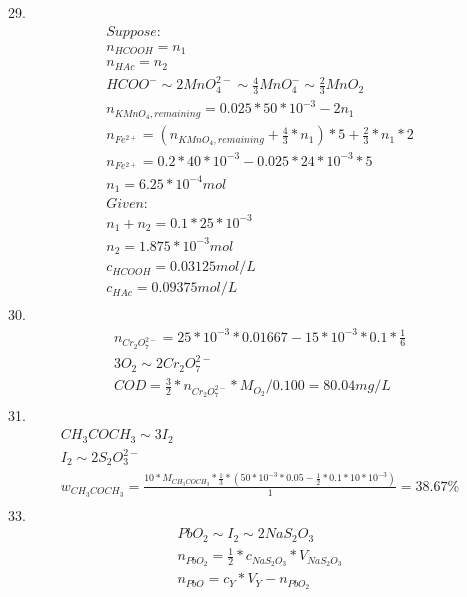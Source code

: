 \documentclass{article}
\begin{document}
29.\begin{equation}
    \begin{multlined}
        Suppose:\\
        n_{HCOOH} = n_1\\
        n_{HAc} = n_2\\
        HCOO^-\sim2MnO_4^{2-}\sim\frac{4}{3}MnO_4^-\sim \frac{2}{3}MnO_2\\
        n_{KMnO_4, remaining} = 0.025*50*10^{-3} - 2n_1\\
        n_{Fe^{2+}} = (n_{KMnO_4, remaining} + \frac{4}{3}*n_1)*5 + \frac{2}{3}*n_1*2\\
        n_{Fe^{2+}} = 0.2*40*10^{-3} - 0.025*24*10^{-3}*5\\
        n_1 = 6.25*10^{-4} mol\\
        Given:\\
        n_1 + n_2 = 0.1*25*10^{-3}\\
        n_2 = 1.875*10^{-3}mol\\
        c_{HCOOH} = 0.03125mol/L\\
        c_{HAc} = 0.09375mol/L\\
    \end{multlined}
\end{equation}
30.\begin{equation}
    \begin{multlined}
        n_{Cr_2O_7^{2-}} = 25*10^{-3}*0.01667 - 15*10^{-3}*0.1*\frac{1}{6}\\
        3O_2 \sim 2Cr_2O_7^{2-}\\
        COD = \frac{3}{2}*n_{Cr_2O_7^{2-}}*M_{O_2}/0.100 = 80.04mg/L\\
    \end{multlined}
\end{equation}
31.\begin{equation}
    \begin{multlined}
        CH_3COCH_3 \sim 3I_2\\
        I_2 \sim 2S_2O_3^{2-}\\
        w_{CH_3COCH_3} = \frac{10* M_{CH_3COCH_3}*\frac{1}{3}*(50*10^{-3}*0.05 - \frac{1}{2}*0.1*10*10^{-3})}{1} = 38.67\%\\
    \end{multlined}
\end{equation}
33.\begin{equation}
    \begin{multlined}
        PbO_2\sim I_2\sim 2NaS_2O_3\\
        n_{PbO_2} = \frac{1}{2}*c_{NaS_2O_3} * V_{NaS_2O_3}\\
        n_{PbO} = c_Y*V_Y - n_{PbO_2}\\
    \end{multlined}
\end{equation}
\end{document}
